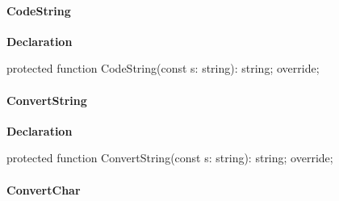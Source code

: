 \documentclass{report}
\newif\ifpdf
\begin{document}
\paragraph*{CodeString}\hspace*{\fill}

\label{PasDoc_GenSimpleXML.TSimpleXMLDocGenerator-CodeString}
\begin{list}{}{
\setlength{\itemindent}{0cm}
\setlength{\listparindent}{0cm}
\setlength{\leftmargin}{\evensidemargin}
\addtolength{\leftmargin}{\tmplength}
\settowidth{\labelsep}{X}
\addtolength{\leftmargin}{\labelsep}
\setlength{\labelwidth}{\tmplength}
}
\item[\textbf{Declaration}\hfill]
\ifpdf
\begin{flushleft}
\fi
\begin{ttfamily}
protected function CodeString(const s: string): string; override;\end{ttfamily}

\ifpdf
\end{flushleft}
\fi

\end{list}
\paragraph*{ConvertString}\hspace*{\fill}

\label{PasDoc_GenSimpleXML.TSimpleXMLDocGenerator-ConvertString}
\begin{list}{}{
\setlength{\itemindent}{0cm}
\setlength{\listparindent}{0cm}
\setlength{\leftmargin}{\evensidemargin}
\addtolength{\leftmargin}{\tmplength}
\settowidth{\labelsep}{X}
\addtolength{\leftmargin}{\labelsep}
\setlength{\labelwidth}{\tmplength}
}
\item[\textbf{Declaration}\hfill]
\ifpdf
\begin{flushleft}
\fi
\begin{ttfamily}
protected function ConvertString(const s: string): string; override;\end{ttfamily}

\ifpdf
\end{flushleft}
\fi

\end{list}
\paragraph*{ConvertChar}\hspace*{\fill}
\end{document}
